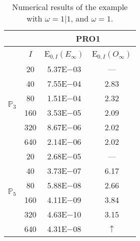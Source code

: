 \begin{table}[H]
\caption{Numerical results of the example with $\omega=1|1$, and $\omega=1$.}
\setlength{\tabcolsep}{5pt}
\centering
\begin{tabular}{@{}l c c c@{}}
\toprule
 &  & \multicolumn{2}{c}{PRO1}\\
\midrule
 & $I$ & E$_{0,I}(E_{\infty})$ & E$_{0,I}(O_{\infty})$\\
\midrule
\multirow{6}{*}{$\mathbb{P}_{3}$}
 & 20 & 5.37E$-$03 & ---\\
 & 40 & 7.55E$-$04 & 2.83\\
 & 80 & 1.51E$-$04 & 2.32\\
 & 160 & 3.53E$-$05 & 2.09\\
 & 320 & 8.67E$-$06 & 2.02\\
 & 640 & 2.14E$-$06 & 2.02\\
\midrule
\multirow{6}{*}{$\mathbb{P}_{5}$}
 & 20 & 2.68E$-$05 & ---\\
 & 40 & 3.73E$-$07 & 6.17\\
 & 80 & 5.88E$-$08 & 2.66\\
 & 160 & 4.11E$-$09 & 3.84\\
 & 320 & 4.63E$-$10 & 3.15\\
 & 640 & 4.31E$-$08 & $\uparrow$\\
\bottomrule
\end{tabular}
\label{Table:PRO:test_01_01_test27_pro1}
\end{table}
